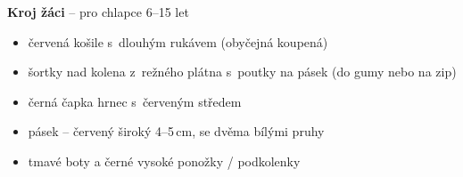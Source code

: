 \documentclass[11pt]{article}
\begin{document}
\begin{minipage}{0.6\linewidth}
  \center
  \textbf{Kroj žáci} – pro chlapce 6–15 let

  \begin{itemize}[itemsep=-3pt,leftmargin=2em]
    \item červená košile s~dlouhým rukávem (obyčejná koupená)
    \item šortky nad kolena z~režného plátna s~poutky na pásek (do gumy nebo na zip)
    \item černá čapka \luv{}hrnec\ruv{} s~červeným středem
    \item pásek – červený široký 4–5\,cm, se dvěma bílými pruhy
    \item tmavé boty a černé vysoké ponožky / podkolenky
  \end{itemize}
\end{minipage}

\vspace*{24pt}
\end{document}
